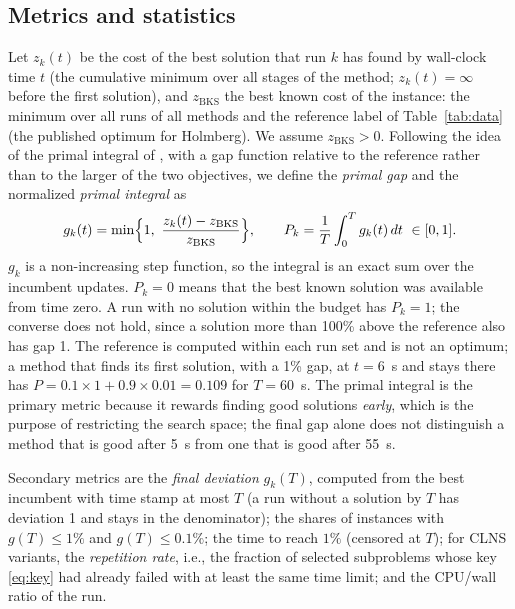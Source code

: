 \subsection{Metrics and statistics}\label{sec:metrics}
Let $z_k(t)$ be the cost of the best solution that run $k$ has found by wall-clock time $t$
(the cumulative minimum over all stages of the method; $z_k(t)=\infty$ before the first
solution), and $z_{\mathrm{BKS}}$ the best known cost of the instance: the minimum over all runs
of all methods and the reference label of Table~\ref{tab:data} (the published optimum for
Holmberg). We assume $z_{\mathrm{BKS}}>0$. Following the idea of the primal integral of
\citet{berthold2013}, with a gap function relative to the reference rather than to the larger of
the two objectives, we define the \emph{primal gap} and the normalized \emph{primal integral} as
\begin{equation}\label{eq:pi}
g_k(t)=\min\Bigl\{1,\ \frac{z_k(t)-z_{\mathrm{BKS}}}{z_{\mathrm{BKS}}}\Bigr\},
\qquad
P_k=\frac{1}{T}\int_0^T g_k(t)\,dt\ \in[0,1].
\end{equation}
$g_k$ is a non-increasing step function, so the integral is an exact sum over the incumbent
updates. $P_k=0$ means that the best known solution was available from time zero. A run with no solution
within the budget has $P_k=1$; the converse does not hold, since a solution more than 100\% above
the reference also has gap 1. The reference is computed within each run set and is not an
optimum; a method that finds its first solution, with a
1\% gap, at $t=6$~s and stays there has $P = 0.1\times 1+0.9\times0.01=0.109$ for $T=60$~s. The
primal integral is the primary metric because it rewards finding good solutions \emph{early},
which is the purpose of restricting the search space; the final gap alone does not distinguish a
method that is good after 5~s from one that is good after 55~s.

Secondary metrics are the \emph{final deviation} $g_k(T)$, computed from the best incumbent
with time stamp at most $T$ (a run without a solution by $T$ has deviation 1 and stays in the
denominator); the shares of instances with
$g(T)\le1\%$ and $g(T)\le0.1\%$; the time to reach $1\%$ (censored at $T$); for CLNS variants,
the \emph{repetition rate}, i.e., the fraction of selected subproblems whose key \eqref{eq:key}
had already failed with at least the same time limit; and the CPU/wall ratio of the run.

